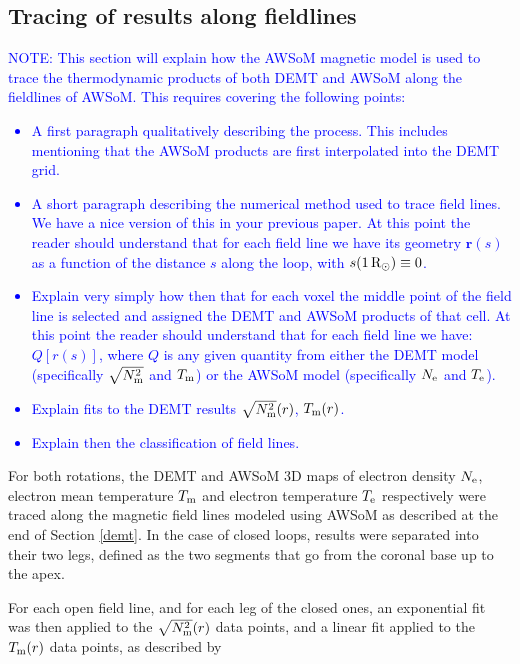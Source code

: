 \documentclass[namedreferences]{solarphysics}
\newcommand{\mrsun}{{\rm R_\odot}}
\newcommand{\Te}{T_{\rm e}}
\newcommand{\Tm}{T_{\rm m}}
\newcommand{\Ne}{N_{\rm e}}
\newcommand{\Nsqm}{N^2_{{\rm m}}}
\newcommand{\sqravgN}{\sqrt{\Nsqm}}
\def\notebyalbert#1{\textcolor{blue}{NOTE: #1}}
\begin{document}
\begin{article}
\subsection{Tracing of results along fieldlines}\label{trace} 

\noindent\notebyalbert{This section will explain how the AWSoM magnetic model is used to trace the thermodynamic products of both DEMT and AWSoM along the fieldlines of AWSoM. This requires covering the following points:
\begin{itemize}
  \item A first paragraph qualitatively describing the process. This includes mentioning that the AWSoM products are first interpolated into the DEMT grid.
  \item A short paragraph describing the numerical method used to trace field lines. We have a nice version of this in your previous paper.  At this point the reader should understand that for each field line we have its geometry $\mathbf{r}(s)$ as a function of the distance $s$ along the loop, with $s(1\,\mrsun)\equiv 0$. 
  \item Explain very simply how then that for each voxel the middle point of the field line is selected and assigned the DEMT and AWSoM products of that cell. At this point the reader should understand that for each field line we have: $Q[r(s)]$, where $Q$ is any given quantity from either the DEMT model (specifically $\sqravgN$ and $\Tm$) or the AWSoM model (specifically $\Ne$ and $\Te$).
  \item Explain fits to the DEMT results  $\sqravgN(r)$, $\Tm(r)$.
  \item Explain then the classification of field lines.
\end{itemize}
} 

For both rotations, the DEMT and AWSoM 3D maps of electron density $\Ne$, electron mean temperature $\Tm$ and electron temperature $\Te$ respectively were traced along the magnetic field lines modeled using AWSoM as described at the end of Section \ref{demt}. In the case of closed loops, results were separated into their two legs, defined as the two segments that go from the coronal base up to the apex.

For each open field line, and for each leg of the closed ones, an exponential fit was then applied to {the $\sqravgN(r)$ data points, and a linear fit applied to the $\Tm(r)$ data points}, as described by



\end{article}
\end{document}
